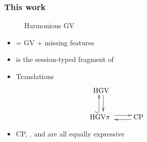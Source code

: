 \documentclass[serif]{beamer}
\begin{document}
\begin{frame}[fragile]
\frametitle{This work}

\begin{description}
\item[\hgv] Harmonious GV
\end{description}

\begin{itemize}
\item \hgv = GV + missing features
\item \hgvpi is the session-typed fragment of \hgv
\item Translations
\[
\hspace{-2cm}
\xymatrix{%
  \mbox{\hgv}
  \ar@<+.7ex>[d]
\\
\raisebox{0ex}[2ex]{\hgvpi}
  \ar@<+.7ex>@{^{(}->}[u]
  \ar@<+.7ex>[r]
&
  \mbox{CP}
  \ar@<+.7ex>[l]
}
\]
\item CP, \hgv, and \hgvpi are all equally expressive
\end{itemize}

\end{frame}
\end{document}

